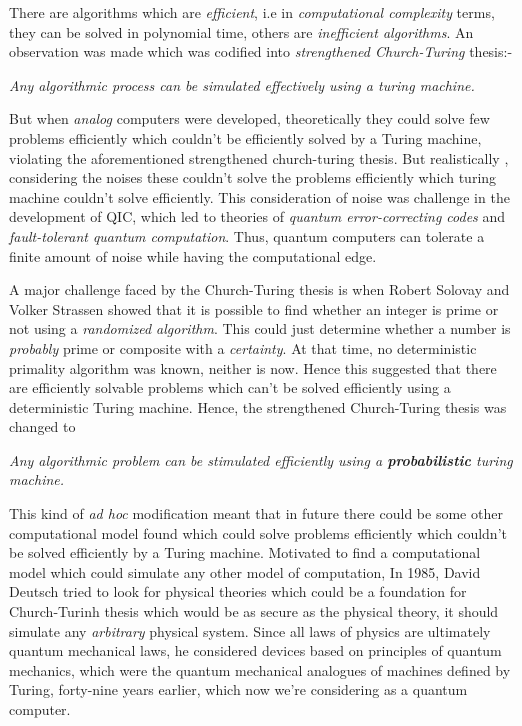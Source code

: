 There are algorithms which are \textit{efficient}, i.e in \textit{computational complexity } terms, they can be solved in polynomial time, others are \textit{inefficient algorithms}. An observation was made which was codified into \textit{strengthened Church-Turing} thesis:-
\begin{center}
    \textit{Any algorithmic process can be simulated effectively using a turing machine.}
\end{center}
But when \textit{analog} computers were developed, theoretically they could solve few problems efficiently which couldn't be efficiently solved by a Turing machine, violating the aforementioned strengthened church-turing thesis. But realistically , considering the noises these couldn't solve the problems efficiently which turing machine couldn't solve efficiently. This consideration of noise was challenge in the development of QIC, which led to theories of \textit{quantum error-correcting codes} and \textit{fault-tolerant quantum computation}. Thus, quantum computers can tolerate a finite amount of noise while having the computational edge.

A major challenge faced by the Church-Turing thesis is when Robert Solovay and Volker Strassen showed that it is possible to find whether an integer is prime or not using a \textit{randomized algorithm}. This could just determine whether a number is \textit{probably} prime or composite with a \textit{certainty}.  At that time, no deterministic primality algorithm was known, neither is now. Hence this suggested that there are efficiently solvable problems which can't be solved efficiently using a deterministic Turing machine. Hence, the strengthened Church-Turing thesis was changed to

\begin{center}
    \textit{Any algorithmic problem can be stimulated efficiently using a \textbf{probabilistic} turing machine.}
\end{center}

This kind of \textit{ad hoc} modification meant that in future there could be some other computational model found which could solve problems efficiently which couldn't be solved efficiently by a Turing machine. Motivated to find a computational model which could simulate any other model of computation, In 1985, David Deutsch tried to look for physical theories which could be a foundation for Church-Turinh thesis which would be as secure as the physical theory, it should simulate any \textit{arbitrary} physical system. Since all laws of physics are ultimately quantum mechanical laws, he considered devices based on principles of quantum mechanics, which were the quantum mechanical analogues of machines defined by Turing, forty-nine years earlier, which now we're considering as a quantum computer.

